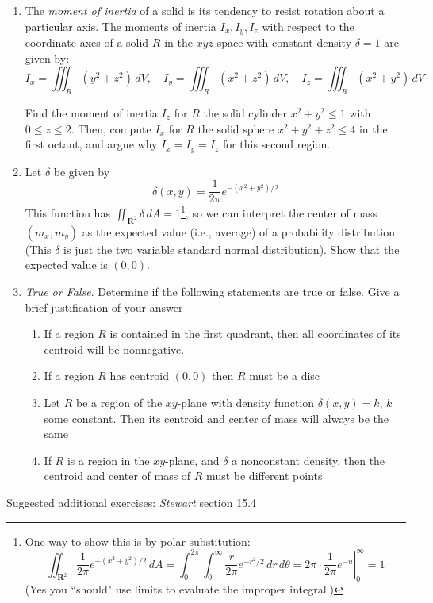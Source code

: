 \documentclass[12pt]{article}
\numberwithin{equation}{subsection}
\numberwithin{figure}{subsection}
\theoremstyle{note}
\begin{document}
{\begin{enumerate}[label=\arabic*.]
\item The \textit{moment of inertia} of a solid is its tendency to resist rotation about a particular axis. The moments of inertia $I_x,I_y,I_z$ with respect to the coordinate axes of a solid $R$ in the $xyz$-space with constant density $\delta=1$ are given by: \[ I_x = \iiint_R (y^2+z^2)\,dV, \quad I_y = \iiint_R (x^2+z^2)\,dV, \quad  I_z = \iiint_R (x^2+y^2)\,dV\]

Find the moment of inertia $I_z$ for $R$ the solid cylinder $x^2+y^2\leq 1$ with $0\leq z\leq 2$. Then, compute $I_x$ for $R$ the solid sphere $x^2+y^2+z^2\leq 4$ in the first octant, and argue why $I_x=I_y=I_z$ for this second region. 

\item  Let $\delta$ be given by \[\delta(x,y)=\dfrac{1}{2\pi} e^{-(x^2+y^2)/2}\] This function has $\iint_{\mathbf{R}^2} \delta\,dA=1$\footnote{One way to show this is by polar substitution: \[ \iint_{\mathbf{R}^2} \dfrac{1}{2\pi} e^{-(x^2+y^2)/2}\,dA=\int_{0}^{2\pi} \int_0^{\infty} \dfrac{r}{2\pi} e^{-r^2/2}\,dr\,d\theta= \left.2\pi \cdot \dfrac{1}{2\pi}e^{-u} \right\vert_{0}^{\infty}=1\] (Yes you ``should" use limits to evaluate the improper integral.)}, so we can interpret the center of mass $(m_x,m_y)$ as the expected value (i.e., average) of a probability distribution (This $\delta$ is just the two variable \href{https://en.wikipedia.org/wiki/Normal_distribution}{standard normal distribution}). Show that the expected value is $(0,0)$.

\item  \textit{True or False}. Determine if the following statements are true or false. Give a brief justification of your answer

\begin{enumerate}
	\item If a region $R$ is contained in the first quadrant, then all coordinates of its centroid will be nonnegative. 
	\item If a region $R$ has centroid $(0,0)$ then $R$ must be a disc
	\item Let $R$ be a region of the $xy$-plane with density function $\delta(x,y)=k$, $k$ some constant. Then its centroid and center of mass will always be the same
	\item If $R$ is a region in the $xy$-plane, and $\delta$ a  nonconstant density, then the centroid and center of mass of $R$ must be different points

\end{enumerate}
\end{enumerate}
Suggested additional exercises: \textit{Stewart} section 15.4



}
\end{document}
